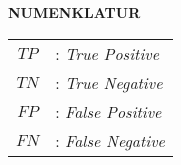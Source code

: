 \begin{center}
	\Large\textbf{NUMENKLATUR}
\end{center}
\vspace{1ex}

\begin{tabular}{c m{30em}}
	$TP$ & : \textit{True Positive}\\
	$TN$ & : \textit{True Negative}\\
	$FP$ & : \textit{False Positive}\\
	$FN$ & : \textit{False Negative}
\end{tabular}
\vspace{1ex}